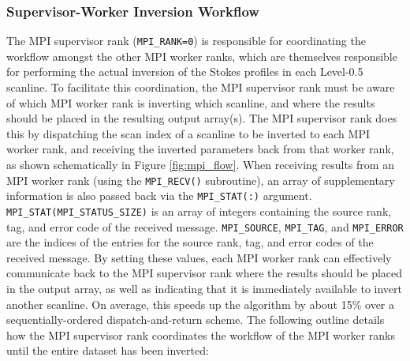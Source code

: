 \documentclass[11pt]{article}
\begin{document}
\subsubsection{Supervisor-Worker Inversion Workflow}\label{ss:m-s}
The MPI supervisor rank (\texttt{MPI\_RANK=0}) is responsible for coordinating the workflow amongst
the other MPI worker ranks, which are themselves responsible for performing the actual inversion of
the Stokes profiles in each \solisvsm Level-0.5 scanline.  To facilitate this coordination,
the MPI supervisor rank must be aware of which MPI worker rank is inverting which scanline, and
where the results should be placed in the resulting output array(s).  The MPI supervisor rank
does this by dispatching the scan index of a scanline to be inverted to each MPI worker rank,
and receiving the inverted parameters back from that worker rank, as shown schematically in
Figure \ref{fig:mpi_flow}.  When receiving results from an MPI worker rank (using the 
\texttt{MPI\_RECV()} subroutine), an array of supplementary information is also passed back
via the \texttt{MPI\_STAT(:)} argument.  \texttt{MPI\_STAT(MPI\_STATUS\_SIZE)} is an array
of integers containing the source rank, tag, and error code of the received message.
\texttt{MPI\_SOURCE}, \texttt{MPI\_TAG}, and \texttt{MPI\_ERROR} are the indices of the entries
for the source rank, tag, and error codes of the received message.  By setting these values, each
MPI worker rank can effectively communicate back to the MPI supervisor rank where the results should
be placed in the output array, as well as indicating that it is immediately available to invert another scanline.
On average, this speeds up the algorithm by about 15\% over a sequentially-ordered dispatch-and-return
scheme.  The following outline details how the MPI supervisor rank coordinates the workflow of the
MPI worker ranks until the entire dataset has been inverted:
\end{document}
